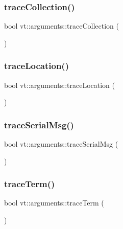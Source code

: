 \subsubsection{\texorpdfstring{trace\+Collection()}{traceCollection()}}
{\footnotesize\ttfamily bool vt\+::arguments\+::trace\+Collection (\begin{DoxyParamCaption}{ }\end{DoxyParamCaption})\hspace{0.3cm}{\ttfamily [inline]}}

\mbox{\label{namespacevt_1_1arguments_aa49925bcb858fa5bb4779a8e5db3b368}} 
\subsubsection{\texorpdfstring{trace\+Location()}{traceLocation()}}
{\footnotesize\ttfamily bool vt\+::arguments\+::trace\+Location (\begin{DoxyParamCaption}{ }\end{DoxyParamCaption})\hspace{0.3cm}{\ttfamily [inline]}}

\mbox{\label{namespacevt_1_1arguments_ad239f3b085f99c963780dbcb0efd5668}} 
\subsubsection{\texorpdfstring{trace\+Serial\+Msg()}{traceSerialMsg()}}
{\footnotesize\ttfamily bool vt\+::arguments\+::trace\+Serial\+Msg (\begin{DoxyParamCaption}{ }\end{DoxyParamCaption})\hspace{0.3cm}{\ttfamily [inline]}}

\mbox{\label{namespacevt_1_1arguments_a60b229dc93c6fce2f24faa8237137a89}} 
\subsubsection{\texorpdfstring{trace\+Term()}{traceTerm()}}
{\footnotesize\ttfamily bool vt\+::arguments\+::trace\+Term (\begin{DoxyParamCaption}{ }\end{DoxyParamCaption})\hspace{0.3cm}{\ttfamily [inline]}}

